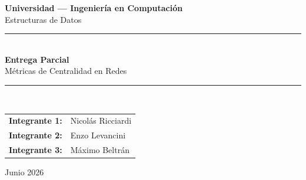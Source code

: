 \begin{titlepage}
    \centering
    \vspace*{1.5cm}

    {\large \textbf{Universidad --- Ingeniería en Computación}}\\[0.3cm]
    {\large Estructuras de Datos}\\[2cm]

    \noindent\rule{\linewidth}{1pt}\\[0.4cm]
    {\LARGE \textbf{Entrega Parcial}}\\[0.3cm]
    {\Large Métricas de Centralidad en Redes}\\[0.3cm]
    \noindent\rule{\linewidth}{1pt}\\[2cm]

    \begin{tabular}{ll}
        \textbf{Integrante 1:} & Nicolás Ricciardi \\[0.4cm]
        \textbf{Integrante 2:} & Enzo Levancini \\[0.4cm]
        \textbf{Integrante 3:} & Máximo Beltrán \\[0.4cm]
    \end{tabular}

    \vfill
    {\large Junio 2026}
\end{titlepage}

\tableofcontents
\newpage
